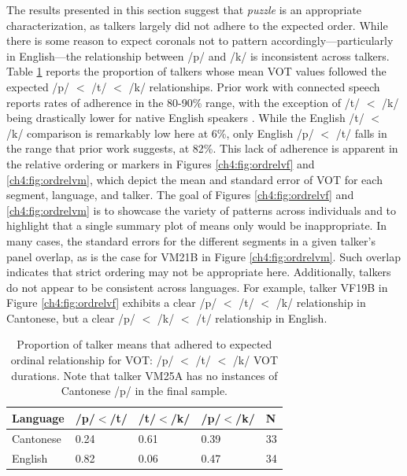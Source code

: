 The results presented in this section suggest that \textit{puzzle} is an appropriate characterization, as talkers largely did not adhere to the expected order. While there is some reason to expect coronals not to pattern accordingly---particularly in English---the relationship between /p/ and /k/ is inconsistent across talkers. Table \ref{tab:ordrel} reports the proportion of talkers whose mean VOT values followed the expected /p/ $<$ /t/ $<$ /k/ relationships. Prior work with connected speech reports rates of adherence in the 80-90\% range, with the exception of /t/ $<$ /k/ being drastically lower for native English speakers \citep{chodroff_2019_l2}. While the English /t/ $<$ /k/ comparison is remarkably low here at 6\%, only English /p/ $<$ /t/ falls in the range that prior work suggests, at 82\%. This lack of adherence is apparent in the relative ordering or markers in Figures \ref{ch4:fig:ordrelvf} and \ref{ch4:fig:ordrelvm}, which depict the mean and standard error of VOT for each segment, language, and talker. The goal of Figures \ref{ch4:fig:ordrelvf} and \ref{ch4:fig:ordrelvm} is to showcase the variety of patterns across individuals and to highlight that a single summary plot of means only would be inappropriate. In many cases, the standard errors for the different segments in a given talker's panel overlap, as is the case for VM21B in Figure \ref{ch4:fig:ordrelvm}. Such overlap indicates that strict ordering may not be appropriate here. Additionally, talkers do not appear to be consistent across languages. For example, talker VF19B in Figure \ref{ch4:fig:ordrelvf} exhibits a clear /p/ $<$ /t/ $<$ /k/ relationship in Cantonese, but a clear /p/ $<$ /k/ $<$ /t/ relationship in English.

\begin{table}[hb!]
\caption{Proportion of talker means that adhered to expected ordinal relationship for VOT: /p/ $<$ /t/ $<$ /k/ VOT durations. Note that talker VM25A has no instances of Cantonese /p/ in the final sample.}
  \label{tab:ordrel}
  \centering
  \begin{tabular}{lllll}
    \toprule
    \textbf{Language} & \textbf{/p/$<$/t/} & \textbf{/t/$<$/k/} & \textbf{/p/$<$/k/} & \textbf{N} \\
    \midrule
    Cantonese & 0.24  & 0.61  & 0.39  & 33 \\
    English     & 0.82  & 0.06  & 0.47  & 34 \\
    \bottomrule
  \end{tabular}
\end{table}

